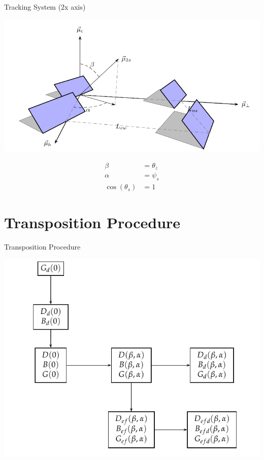 \documentclass[xcolor={usenames,svgnames,dvipsnames}]{beamer}
\begin{document}
\begin{frame}[plain,label={sec:org8193aea}]{Tracking System (2x axis)}
\begin{center}
\includegraphics[width=.9\linewidth]{../figs/Sombra2X.pdf}
\end{center}


\begin{align*}
  \beta &= \theta_{z}\\
  \alpha &= \psi_{s}\\
  \cos(\theta_{s}) &= 1
\end{align*}
\end{frame}




\section{Transposition Procedure}
\label{sec:orgb497e40}

\begin{frame}[label={sec:org17bc151}]{Transposition Procedure}
\begin{center}
\includegraphics[width=.9\linewidth]{../figs/ProcedimientoCalculoRadiacionInclinada.pdf}
\end{center}
\end{frame}
\end{document}
